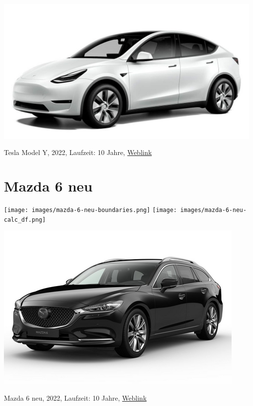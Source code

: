 \documentclass[landscape, DIV=99, 14pt]{scrartcl}
\begin{document}
\pagebreak
\null
\vspace{2cm}
\begin{center}
\includegraphics[width=0.9\columnwidth]{cars/tesla-model-y.jpg}

Tesla Model Y, 2022, Laufzeit: 10 Jahre, \href{https://www.tesla.com/de_de/modely/design\#overview}{Weblink}
\end{center}

\pagebreak


\twocolumn

\section*{Mazda 6 neu}
\begin{center}
\texttt{[image: images/mazda-6-neu-boundaries.png]}
\null
\vspace{0.5cm}
\texttt{[image: images/mazda-6-neu-calc\_df.png]}
\end{center}

\pagebreak
\null
\vspace{2cm}
\begin{center}
\includegraphics[width=0.9\columnwidth]{cars/mazda-6-neu.png}

Mazda 6 neu, 2022, Laufzeit: 10 Jahre, \href{https://konfigurator.meinauto.de/mazda/neuwagen/48-6/angebote/6-kombi/konfigurator/\#!/extras/exclusive-line/8846370/10,11/private/65352-5416-204698/984/61c9aa657e74c/cash-purchase/32545--287374/48,0,10000,0,0,0,0,0,}{Weblink}
\end{center}
\end{document}
